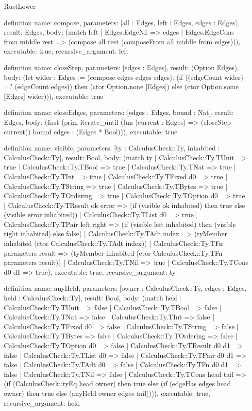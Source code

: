 \begin{lexlean}{RustLower}
\begin{semanticmodule}
definition{
  name: compose,
  parameters: [all : Edges, left : Edges, edges : Edges],
  result: Edges,
  body: (match left
    | Edges.EdgeNil => edges
    | Edges.EdgeCons from middle rest => (compose all rest (composeFrom all middle from edges))),
  executable: true,
  recursive_argument: left
}

definition{
  name: closeStep,
  parameters: [edges : Edges],
  result: (Option Edges),
  body: (let wider : Edges := (compose edges edges edges); (if ((edgeCount wider) =? (edgeCount edges)) then (ctor Option.none [Edges]) else (ctor Option.some [Edges] wider))),
  executable: true
}

definition{
  name: closeEdges,
  parameters: [edges : Edges, bound : Nat],
  result: Edges,
  body: (first (prim iterate_until (fun (current : Edges) => (closeStep current)) bound edges : (Edges * Bool))),
  executable: true
}

definition{
  name: visible,
  parameters: [ty : CalculusCheck::Ty, inhabited : CalculusCheck::Ty],
  result: Bool,
  body: (match ty
    | CalculusCheck::Ty.TUnit => true
    | CalculusCheck::Ty.TBool => true
    | CalculusCheck::Ty.TNat => true
    | CalculusCheck::Ty.TInt => true
    | CalculusCheck::Ty.TFixed d0 => true
    | CalculusCheck::Ty.TString => true
    | CalculusCheck::Ty.TBytes => true
    | CalculusCheck::Ty.TOrdering => true
    | CalculusCheck::Ty.TOption d0 => true
    | CalculusCheck::Ty.TResult ok error => (if (visible ok inhabited) then true else (visible error inhabited))
    | CalculusCheck::Ty.TList d0 => true
    | CalculusCheck::Ty.TPair left right => (if (visible left inhabited) then (visible right inhabited) else false)
    | CalculusCheck::Ty.TAdt index => (tyMember inhabited (ctor CalculusCheck::Ty.TAdt index))
    | CalculusCheck::Ty.TFn parameters result => (tyMember inhabited (ctor CalculusCheck::Ty.TFn parameters result))
    | CalculusCheck::Ty.TNil => true
    | CalculusCheck::Ty.TCons d0 d1 => true),
  executable: true,
  recursive_argument: ty
}

definition{
  name: anyHeld,
  parameters: [owner : CalculusCheck::Ty, edges : Edges, held : CalculusCheck::Ty],
  result: Bool,
  body: (match held
    | CalculusCheck::Ty.TUnit => false
    | CalculusCheck::Ty.TBool => false
    | CalculusCheck::Ty.TNat => false
    | CalculusCheck::Ty.TInt => false
    | CalculusCheck::Ty.TFixed d0 => false
    | CalculusCheck::Ty.TString => false
    | CalculusCheck::Ty.TBytes => false
    | CalculusCheck::Ty.TOrdering => false
    | CalculusCheck::Ty.TOption d0 => false
    | CalculusCheck::Ty.TResult d0 d1 => false
    | CalculusCheck::Ty.TList d0 => false
    | CalculusCheck::Ty.TPair d0 d1 => false
    | CalculusCheck::Ty.TAdt d0 => false
    | CalculusCheck::Ty.TFn d0 d1 => false
    | CalculusCheck::Ty.TNil => false
    | CalculusCheck::Ty.TCons head tail => (if (CalculusCheck::tyEq head owner) then true else (if (edgeHas edges head owner) then true else (anyHeld owner edges tail)))),
  executable: true,
  recursive_argument: held
}


\end{semanticmodule}
\end{lexlean}
